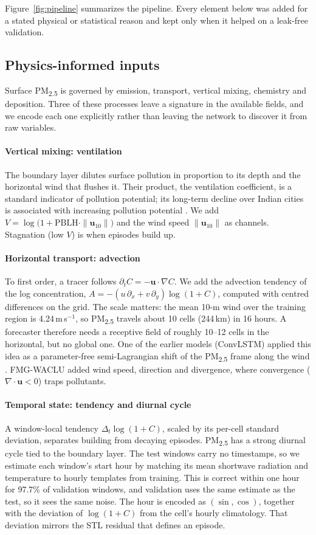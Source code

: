 \documentclass[10pt]{article}
\newcommand{\PM}{PM\textsubscript{2.5}}
\begin{document}
Figure~\ref{fig:pipeline} summarizes the pipeline. Every element below was added for a stated physical or statistical reason and kept only when it helped on a leak-free validation.

\subsection{Physics-informed inputs}
\label{sec:physics}
Surface \PM{} is governed by emission, transport, vertical mixing, chemistry and deposition. Three of these processes leave a signature in the available fields, and we encode each one explicitly rather than leaving the network to discover it from raw variables.

\paragraph{Vertical mixing: ventilation}
The boundary layer dilutes surface pollution in proportion to its depth and the horizontal wind that flushes it. Their product, the ventilation coefficient, is a standard indicator of pollution potential; its long-term decline over Indian cities is associated with increasing pollution potential \citep{iyer2013}. We add $V=\log\!\big(1+\mathrm{PBLH}\cdot\|\mathbf{u}_{10}\|\big)$ and the wind speed $\|\mathbf{u}_{10}\|$ as channels. Stagnation (low $V$) is when episodes build up.

\paragraph{Horizontal transport: advection}
To first order, a tracer follows $\partial_t C=-\mathbf{u}\cdot\nabla C$. We add the advection tendency of the log concentration, $A=-(u\,\partial_x+v\,\partial_y)\log(1+C)$, computed with centred differences on the grid. The scale matters: the mean 10-m wind over the training region is 4.24\,m\,s$^{-1}$, so \PM{} travels about 10 cells (244\,km) in 16 hours. A forecaster therefore needs a receptive field of roughly 10--12 cells in the horizontal, but no global one. One of the earlier models (ConvLSTM) applied this idea as a parameter-free semi-Lagrangian shift of the \PM{} frame along the wind \citep{staniforth1991}. FMG-WACLU added wind speed, direction and divergence, where convergence ($\nabla\cdot\mathbf{u}<0$) traps pollutants.

\paragraph{Temporal state: tendency and diurnal cycle}
A window-local tendency $\Delta_t\log(1+C)$, scaled by its per-cell standard deviation, separates building from decaying episodes. \PM{} has a strong diurnal cycle tied to the boundary layer. The test windows carry no timestamps, so we estimate each window's start hour by matching its mean shortwave radiation and temperature to hourly templates from training. This is correct within one hour for 97.7\% of validation windows, and validation uses the same estimate as the test, so it sees the same noise. The hour is encoded as $(\sin,\cos)$, together with the deviation of $\log(1+C)$ from the cell's hourly climatology. That deviation mirrors the STL residual that defines an episode.
\end{document}
